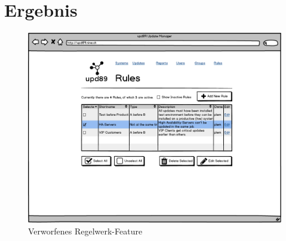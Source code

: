 \chapter{Ergebnis}
\xxx


\begin{figure}[H]
	\centering
	\includegraphics[width=\linewidth]{files/mockups/rules}
	\caption{Verworfenes Regelwerk-Feature}
	\label{fig:ergebnis:rules}
\end{figure}

